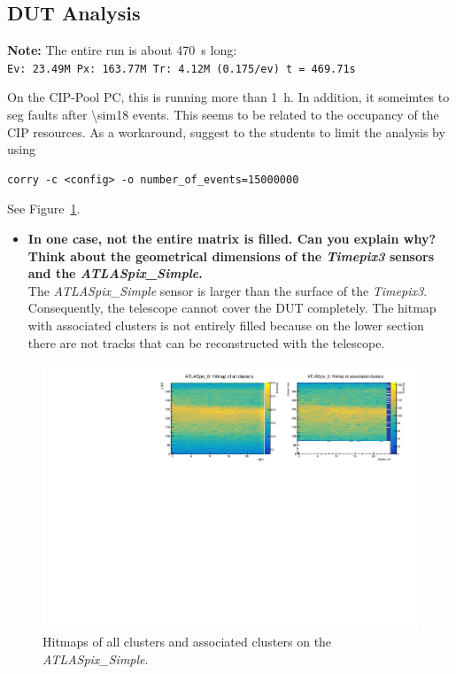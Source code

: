 \documentclass[a4paper,11pt]{article}
\newcommand*{\apx}{\emph{ATLASpix\_Simple}\xspace}
\newcommand*{\tpx}{\emph{Timepix3}\xspace}
\newcommand*{\code}[1]{\texttt{#1}}
\begin{document}
\clearpage
\subsection{DUT Analysis}
\textbf{Note:} The entire run is about \SI{470}{s} long:\\ \code{Ev: 23.49M Px: 163.77M Tr: 4.12M (0.175/ev) t = 469.71s}

On the CIP-Pool PC, this is running more than \SI{1}{h}.
In addition, it someimtes to seg faults after \SI{\sim18}{} events.
This seems to be related to the occupancy of the CIP resources.
As a workaround, suggest to the students to limit the analysis by using
\begin{verbatim}
corry -c <config> -o number_of_events=15000000
\end{verbatim}

See Figure~\ref{fig:09_DUTanalysis}.
\begin{itemize}
\item \textbf{In one case, not the entire matrix is filled. Can you explain why? Think about the geometrical dimensions of the \tpx sensors and the \apx.}\\
The \apx sensor is larger than the surface of the \tpx. Consequently, the telescope cannot cover the DUT completely. The hitmap with associated clusters is not entirely filled because on the lower section there are not tracks that can be reconstructed with the telescope.
\end{itemize}

\begin{figure}[!htb]
\centering
\includegraphics[width=\textwidth]{09_DUTanalysis}
\caption{Hitmaps of all clusters and associated clusters on the \apx.}
\label{fig:09_DUTanalysis}
\end{figure}
\end{document}
